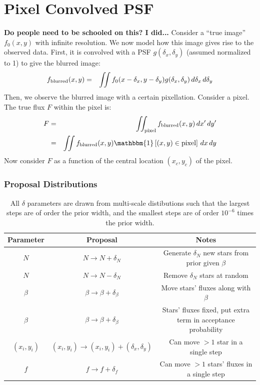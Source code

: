 \documentclass[letterpaper, 11pt]{article}
\begin{document}
\section{Pixel Convolved PSF}
{\bf Do people need to be schooled on this? I did...}
Consider a ``true image'' $f_0(x, y)$ with infinite resolution. We now model how
this image gives rise to the observed data. First, it is convolved with a
PSF $g(\delta_x, \delta_y)$ (assumed normalized to 1) to give the blurred image:
\begin{eqnarray}
f_{\rm{blurred}}(x, y) &=& \iint f_0(x-\delta_x, y-\delta_y)
g(\delta_x, \delta_y) \, d\delta_x \, d\delta_y \label{blur}
\end{eqnarray}
Then, we observe the blurred image with a certain pixellation. Consider a pixel.
The true flux $F$ within the pixel is:
\begin{eqnarray}
F &=& \iint_{\rm pixel} f_{\rm blurred}(x, y) \,dx'\,dy'\\
&=& \iint f_{\rm blurred}(x, y)\mathbbm{1}\left[(x,y) \in \textnormal{pixel}
\right] \,dx\,dy \label{pixel}
\end{eqnarray}
Now consider $F$ as a function of the central location $(x_c, y_c)$ of the
pixel.

\subsubsection{Proposal Distributions}

\begin{table}
\begin{center}
\begin{tabular}{|c|c|c|}
\hline
Parameter & Proposal & Notes\\
\hline
$N$ & $N \to N + \delta_N$ & Generate $\delta_N$ new stars from prior given
$\beta$\\
$N$ & $N \to N - \delta_N$ & Remove $\delta_N$ stars at random\\
$\beta$ & $\beta \to \beta + \delta_\beta$ & Move stars' fluxes along with
$\beta$\\
$\beta$ & $\beta \to \beta + \delta_\beta$ & Stars' fluxes fixed, put extra
term in acceptance probability \\
$(x_i,y_i)$ & $(x_i,y_i) \to (x_i,y_i)+(\delta_x, \delta_y)$ & Can move $>1$ star
in a single step \\
$f$ & $f \to f + \delta_f$ & Can move $>1$ stars' fluxes in a single step\\
\hline
\end{tabular}
\end{center}
\caption{All $\delta$ parameters are drawn from multi-scale distibutions such
that the largest steps are of order the prior width, and the smallest steps
are of order $10^{-6}$ times the prior width.\label{proposals}}
\end{table}
\end{document}
